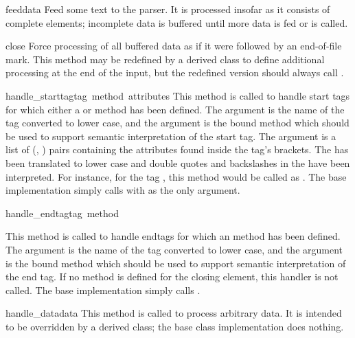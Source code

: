 \begin{funcdesc}{feed}{data}
Feed some text to the parser.  It is processed insofar as it consists
of complete elements; incomplete data is buffered until more data is
fed or  is called.
\end{funcdesc}

\begin{funcdesc}{close}{}
Force processing of all buffered data as if it were followed by an
end-of-file mark.  This method may be redefined by a derived class to
define additional processing at the end of the input, but the
redefined version should always call .
\end{funcdesc}

\begin{funcdesc}{handle_starttag}{tag\, method\, attributes}
This method is called to handle start tags for which either a
 or  method has been
defined.  The  argument is the name of the tag converted to
lower case, and the  argument is the bound method which
should be used to support semantic interpretation of the start tag.
The  argument is a list of (, )
pairs containing the attributes found inside the tag's \code{<>}
brackets.  The  has been translated to lower case and double
quotes and backslashes in the  have been interpreted.  For
instance, for the tag , this
method would be called as .  The base implementation simply calls
 with  as the only argument.
\end{funcdesc}

\begin{funcdesc}{handle_endtag}{tag\, method}

This method is called to handle endtags for which an
 method has been defined.  The 
argument is the name of the tag converted to lower case, and the
 argument is the bound method which should be used to
support semantic interpretation of the end tag.  If no
 method is defined for the closing element, this
handler is not called.  The base implementation simply calls
.
\end{funcdesc}

\begin{funcdesc}{handle_data}{data}
This method is called to process arbitrary data.  It is intended to be
overridden by a derived class; the base class implementation does
nothing.
\end{funcdesc}


